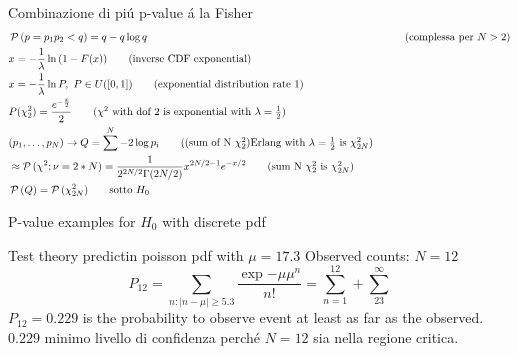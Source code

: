 \documentclass[asd-beamer.tex]{subfiles}%
\begin{document}
\begin{frame}{Combinazione di pi\'u p-value \'a la Fisher}
	\begin{align*}
	&\prob{(p=p_1p_2<q)}=q-q\log{q}&\tag{complessa per $N>2$}\\
	&x=-\frac{1}{\lambda}\ln{(1-F(x))}\tag{inverse CDF exponential}\\
	&x=-\frac{1}{\lambda}\ln{P},\ P\in U([0,1])\tag{exponential distribution rate 1}\\
&P(\chi^2_2)=\frac{\exp{-\frac{x}{2}}}{2}\tag{$\chi^2$ with dof 2 is exponential with $\lambda=\frac{1}{2}$}\\
	&(p_1,\ldots,p_N)\to Q=\sum^N-2\log{p_i}\tag{(sum of N $\chi_2^2$)Erlang with $\lambda=\frac{1}{2}$ is $\chi^2_{2N}$}\\%
	&\approx\prob{(\chi^2;\nu=2*N)}=\frac{1}{2\expy{2N/2}\Gamma(2N/2)}x\expy{2N/2-1}\exp{-x/2}\tag{sum N $\chi^2_2$ is $\chi^2_{2N}$}\\
	&\prob{(Q)}=\prob{(\chi^2_{2N})}\tag*{sotto $H_0$}
	\end{align*}
\end{frame}

\begin{wordonframe}{P-value examples for $H_0$ with discrete pdf}
\begin{block}{Test theory predictin poisson pdf with $\mu=17.3$}
Observed counts: $N=12$
\[P_{12}=\sum_{n: |n-\mu|\geq5.3}\frac{\exp{-\mu}\mu^n}{n!}=\sum_{n=1}^{12}+\sum_{23}^{\infty}\]
$P_{12}=0.229$ is the probability to observe event at least as far as the observed.
$0.229$ minimo livello di confidenza perch\'e $N=12$ sia nella regione critica.
\end{block}
\end{wordonframe}
\end{document}
